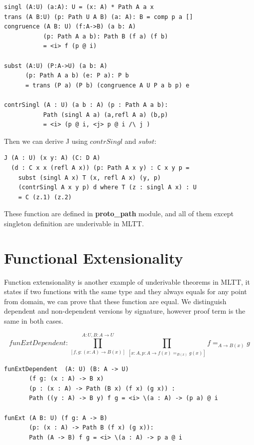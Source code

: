 \documentclass{svproc}
\begin{document}
\begin{lstlisting}[mathescape=true]
singl (A:U) (a:A): U = (x: A) * Path A a x
trans (A B:U) (p: Path U A B) (a: A): B = comp p a []
congruence (A B: U) (f:A->B) (a b: A)
           (p: Path A a b): Path B (f a) (f b)
           = <i> f (p @ i)

subst (A:U) (P:A->U) (a b: A)
      (p: Path A a b) (e: P a): P b
      = trans (P a) (P b) (congruence A U P a b p) e

contrSingl (A : U) (a b : A) (p : Path A a b):
           Path (singl A a) (a,refl A a) (b,p)
           = <i> (p @ i, <j> p @ i /\ j )
\end{lstlisting}

Then we can derive J using $contrSingl$ and $subst$:

\begin{lstlisting}[mathescape=true]
J (A : U) (x y: A) (C: D A)
  (d : C x x (refl A x)) (p: Path A x y) : C x y p =
    subst (singl A x) T (x, refl A x) (y, p)
    (contrSingl A x y p) d where T (z : singl A x) : U
    = C (z.1) (z.2)
\end{lstlisting}

These function are defined in {\bf proto\_path} module, and all of them
except singleton definition are underivable in MLTT.

\section{Functional Extensionality}

Function extensionality is another example of underivable theorems in MLTT, it
states if two functions with the same type and they always equals for
any point from domain, we can prove that these function are equal.
We distinguish dependent and non-dependent versions by signature,
however proof term is the same in both cases.

$$funExtDependent: \prod_{[f,g: (x:A) \rightarrow B(x)]}^{A: U,B:A\rightarrow U}\prod_{[x:A,p:A\rightarrow f(x) =_{B(x)} g(x)]} f =_{A\rightarrow B(x)} g$$

\begin{lstlisting}[mathescape=true]
funExtDependent  (A: U) (B: A -> U)
       (f g: (x : A) -> B x)
       (p : (x : A) -> Path (B x) (f x) (g x)) :
       Path ((y : A) -> B y) f g = <i> \(a : A) -> (p a) @ i

funExt (A B: U) (f g: A -> B)
       (p: (x : A) -> Path B (f x) (g x)):
       Path (A -> B) f g = <i> \(a : A) -> p a @ i
\end{lstlisting}
\end{document}

